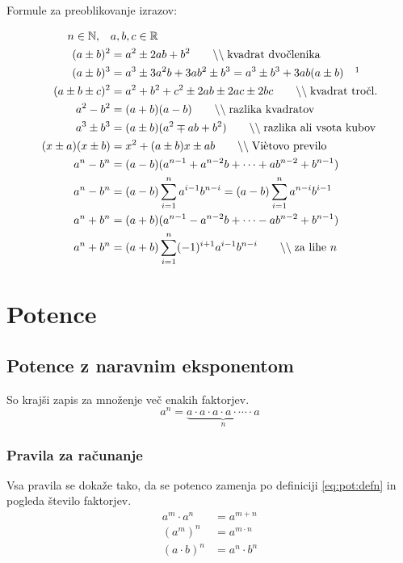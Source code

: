 \documentclass[a4paper,oneside,12pt,fleqn]{article}
\def\R{\ensuremath{\mathbb R}}
\def\N{\ensuremath{\mathbb N}}
\newcommand\krat\cdot
\newcommand{\comment}[1]{\ensuremath{\qquad\backslash\backslash\;}\textnormal{#1}}
\numberwithin{equation}{section}
\begin{document}
Formule za preoblikovanje izrazov:\\
\parbox{\textwidth}{
\begin{align}
   n \in \N, \quad & a, b, c \in \R \nonumber \\
   \label{eq:izr:kvadrat:dvoclenika} (a \pm b)^2 &= a^2 \pm 2ab + b^2 \comment{kvadrat
   dvočlenika} \\
   \label{eq:izr:kub:dvoclenika} (a \pm b)^3 &= a^3 \pm 3a^2b + 3ab^2 \pm b^3 = a^3 \pm
   b^3 + 3ab(a\pm b) \quad \footnotemark \\
   \label{eq:izr:kvadrat:troclenika} (a \pm b \pm c)^2 &= a^2 + b^2 + c^2 \pm 2ab \pm 2ac
   \pm 2bc \comment{kvadrat tročl.} \\
   \label{eq:izr:razlikakvadratov} a^2 - b^2 &= (a+b)(a-b) \comment{razlika kvadratov} \\
   \label{eq:izr:vsotakubov} a^3 \pm b^3 &= (a \pm b)(a^2 \mp ab + b^2) \comment{razlika ali
   vsota kubov} \\
   \label{eq:izr:vietovo} (x\pm a)(x\pm b) &= x^2 + (a\pm b)x \pm ab \comment{Viètovo
   previlo} \\
   \label{eq:izr:ananminusbnan} a^n - b^n &= (a - b)(a^{n-1} + a^{n-2}b + \cdots
   + ab^{n-2} + b^{n-1}) \\ 
   a^n - b^n &= (a - b)\sum_{i=1}^{n} a^{i-1}b^{n-i} = (a - b)\sum_{i=1}^{n} a^{n-i}b^{i-1} \nonumber \\
   \label{eq:izr:ananplubnan}  a^n + b^n &=  (a + b)(a^{n-1} - a^{n-2}b + \cdots
   - ab^{n-2} + b^{n-1}) \\
   a^n +b^n &= (a+b)\sum_{i=1}^{n} (-1)^{i+1}a^{i-1}b^{n-i} \comment{za lihe $n$} \nonumber
\end{align}
}
\section{Potence}
\label{sec:pot}
\subsection{Potence z naravnim eksponentom}
\label{sec:pot:nar}
So krajši zapis za množenje več enakih faktorjev.
\begin{equation}
    a^n = \underbrace{a \krat a \krat a \krat a \krat \cdots \krat a}_n
    \label{eq:pot:defn}
\end{equation}

\subsubsection{Pravila za računanje}
\label{sec:pot:nar:prav}
Vsa pravila se dokaže tako, da se potenco zamenja po definiciji \eqref{eq:pot:defn} in
pogleda število faktorjev.
\begin{align}
  a^m \krat a^n &= a^{m+n} \label{eq:pot:anankratanam} \\
  (a^m)^n &= a^{m\krat n} \label{eq:pot:anannam} \\
  (a\krat b)^n &= a^n \krat b^n \label{eq:pot:akratbnan}
\end{align}
\end{document}
